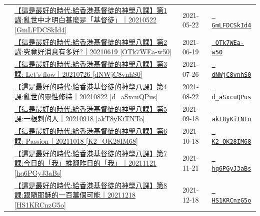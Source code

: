 \documentclass{book}
\begin{document}
{\begin{xltabular}{\textwidth}{|p{0.15\textwidth} p{0.6\textwidth}|p{0.07\textwidth} p{0.1\textwidth}|}
    & \hyperref[sec:GmLFDCSkId4]{【這是最好的時代:給香港基督徒的神學八課】第1講:亂世中才明白甚麼是「基督徒」｜20210522 [GmLFDCSkId4]} & 2021-05-22 & \href{https://youtube.com/watch?v=GmLFDCSkId4}{\texttt{ GmLFDCSkId4}} \\
    & \hyperref[sec:OTk7WEa_w50]{【這是最好的時代:給香港基督徒的神學八課】第2講:究竟好消息有多好?｜20210619 [OTk7WEa-w50]} & 2021-06-19 & \href{https://youtube.com/watch?v=OTk7WEa-w50}{\texttt{ OTk7WEa-w50}} \\
    & \hyperref[sec:dNWjC8vnhS0]{【這是最好的時代:給香港基督徒的神學八課】第3課: Let’s flow｜20210726 [dNWjC8vnhS0]} & 2021-07-26 & \href{https://youtube.com/watch?v=dNWjC8vnhS0}{\texttt{ dNWjC8vnhS0}} \\
    & \hyperref[sec:d_aSxcuQPus]{【這是最好的時代:給香港基督徒的神學八課】第4課:亂世的靈性修持｜20210822 [d\_aSxcuQPus]} & 2021-08-22 & \href{https://youtube.com/watch?v=d_aSxcuQPus}{\texttt{ d\_aSxcuQPus}} \\
    & \hyperref[sec:akT8yKiTNTo]{【這是最好的時代:給香港基督徒的神學八課】第5課:一根刺的人｜20210918 [akT8yKiTNTo]} & 2021-09-18 & \href{https://youtube.com/watch?v=akT8yKiTNTo}{\texttt{ akT8yKiTNTo}} \\
    & \hyperref[sec:K2_OK28IM68]{【這是最好的時代:給香港基督徒的神學八課】第6課: Passion｜20211018 [K2\_OK28IM68]} & 2021-10-18 & \href{https://youtube.com/watch?v=K2_OK28IM68}{\texttt{ K2\_OK28IM68}} \\
    & \hyperref[sec:hq6PGyJ3aBs]{【這是最好的時代:給香港基督徒的神學八課】第7課:今日的「我」推翻昨日的「我」｜20211121 [hq6PGyJ3aBs]} & 2021-11-21 & \href{https://youtube.com/watch?v=hq6PGyJ3aBs}{\texttt{ hq6PGyJ3aBs}} \\
    & \hyperref[sec:HS1KRCnzG5o]{【這是最好的時代:給香港基督徒的神學八課】第8課:跟隨耶穌的一百萬個可能｜20211218 [HS1KRCnzG5o]} & 2021-12-18 & \href{https://youtube.com/watch?v=HS1KRCnzG5o}{\texttt{ HS1KRCnzG5o}} \\
\end{xltabular}
}
\newpage
\end{document}
